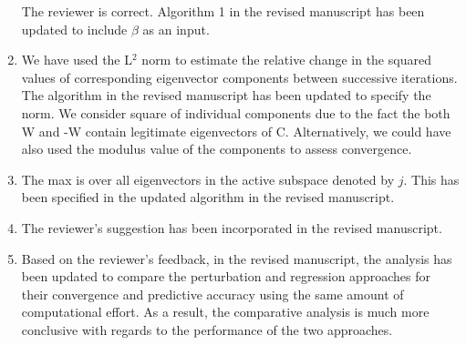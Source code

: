 \documentclass[11pt,final]{article}
\newcommand{\referee}[1]{\vspace{.1ex}\noindent{\textcolor{blue}{#1}}}
\begin{document}
\begin{enumerate}[wide, labelwidth=!, labelindent=0pt]
\noindent The reviewer is correct. Algorithm 1 in the revised manuscript has been updated to include $\beta$
as an input. 

\item \referee{11.42: Which norm is used? Any intuition why squares of W are used, and not just W?}

\noindent We have used the L$^2$ norm to estimate the relative change in the squared values of corresponding
eigenvector components between successive iterations. The algorithm in the revised manuscript has been updated 
to specify the norm. 
We consider square of individual components due to the fact the both W and -W contain legitimate eigenvectors 
of C. Alternatively, we could have also used the modulus value of the components to assess convergence. 

\item \referee{11.45: what is max over?}

\noindent The max is over all eigenvectors in the active subspace denoted by $j$. This has been specified in
the updated algorithm in the revised manuscript.

\item \referee{12.29: 'higher-order' should be replaced with higher-index or smaller-magnitude, to avoid confusion.}

\noindent The reviewer's suggestion has been incorporated in the revised manuscript.

\item \referee{Figs 2a, 3 and 4 demonstrate the regression-based gradient computation is working
similarly to the perturbation based one. However, the comparison is really qualitative and does
 not provide much insight. Clearly, regression will approximate the gradient less accurately then
a local perturbation, but the latter has a price associated with it as new simulations are needed
(a factor of d+1). It would have been great to see how accurate each method is for comparable
expense, or vice-verse, how expensive each approach is for a comparable accuracy. I know there
is a statement about this at the end of Section 4, but it is neither sufficient nor quantitative.
Same goes for statements in Section 5.2 - it was not clear whether regression- and
perturbation- based approaches had comparable expenses (in terms of model evaluations) or not.}

\noindent Based on the reviewer's feedback, in the revised manuscript, the analysis has been
updated to
compare the perturbation and regression approaches for their convergence and predictive 
accuracy using the same amount of computational effort. As a result, the comparative 
analysis is much more conclusive with regards to the performance of the two approaches. 


\end{enumerate}
\end{document}
